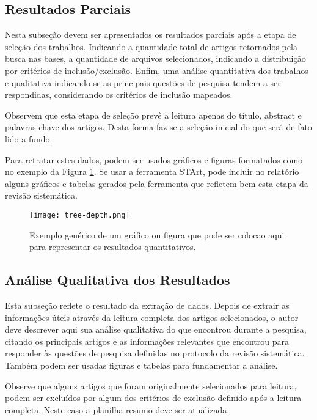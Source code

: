 \documentclass[12pt]{article}
\begin{document}
\subsection{Resultados Parciais}

Nesta subseção devem ser apresentados os resultados parciais após a etapa de seleção dos trabalhos. Indicando a quantidade total de artigos retornados pela busca nas bases, a quantidade de arquivos selecionados, indicando a distribuição por critérios de inclusão/exclusão. Enfim, uma análise quantitativa dos trabalhos e qualitativa indicando se as principais questões de pesquisa tendem a ser respondidas, considerando os critérios de inclusão mapeados. 

Observem que esta etapa de seleção prevê a leitura apenas do título, abstract e palavras-chave dos artigos. Desta forma faz-se a seleção inicial do que será de fato lido a fundo. 

Para retratar estes dados, podem ser usados gráficos e figuras formatados como no exemplo da Figura \ref{fig:depth}. Se usar a ferramenta STArt, pode incluir no relatório alguns gráficos e tabelas gerados pela ferramenta que refletem bem esta etapa da revisão sistemática.

\begin{figure}[tb]
    \centering
    \texttt{[image: tree-depth.png]}
    \caption{Exemplo genérico de um gráfico ou figura que pode ser colocao aqui para representar os resultados quantitativos.}
    \label{fig:depth}
\end{figure}

\subsection{Análise Qualitativa dos Resultados}

Esta subseção reflete o resultado da extração de dados. Depois de extrair as informações úteis através da leitura completa dos artigos selecionados, o autor deve descrever aqui sua análise qualitativa do que encontrou durante a pesquisa, citando os principais artigos e as informações relevantes que encontrou para responder às questões de pesquisa definidas no protocolo da revisão sistemática. Também podem ser usadas figuras e tabelas para fundamentar a análise. 

Observe que alguns artigos que foram originalmente selecionados para leitura, podem ser excluídos por algum dos critérios de exclusão definido após a leitura completa. Neste caso a planilha-resumo deve ser atualizada.
\end{document}
